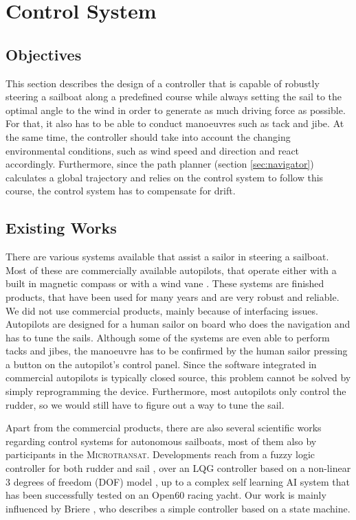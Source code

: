 \section{Control System}\label{sec:sailor}
\subsection{Objectives}
This section describes the design of a controller that is capable of robustly
steering a sailboat along a predefined course while always setting the sail to
the optimal angle to the wind in order to generate as much driving force as
possible. For that, it also has to be able to conduct manoeuvres such as tack
and jibe. At the same time, the controller should take into account the
changing environmental conditions, such as wind speed and direction and react
accordingly. Furthermore, since the path planner (section \ref{sec:navigator})
calculates a global trajectory and relies on the control system to follow this
course, the control system has to compensate for drift.
%
\subsection{Existing Works}
There are various systems available that assist a sailor in steering a
sailboat. Most of these are commercially available autopilots, that operate
either with a built in magnetic compass or with a wind vane
\cite{hochseeportverband1958s}. These systems are finished products, that have
been used for many years and are very robust and reliable. We did not use
commercial products, mainly because of interfacing issues. Autopilots are
designed for a human sailor on board who does the navigation and has to tune
the sails. Although some of the systems are even able to perform tacks and
jibes, the manoeuvre has to be confirmed by the human sailor pressing a button
on the autopilot's control panel. Since the software integrated in commercial
autopilots is typically closed source, this problem cannot be solved by simply
reprogramming the device. Furthermore, most autopilots only control the rudder,
so we would still have to figure out a way to tune the sail.

Apart from the commercial products, there are also several scientific works
regarding control systems for autonomous sailboats, most of them also by
participants in the \textsc{Microtransat}. Developments reach from a fuzzy
logic controller for both rudder and sail \cite{stelzerFuzzy}, over an LQG
controller based on a non-linear 3 degrees of freedom (DOF) model
\cite{elkaim:ska}, up to a complex self learning AI system that has been
successfully tested on an Open60 racing yacht. Our work is mainly influenced by
Briere \cite{briere2008iar}, who describes a simple controller based on a state
machine.
%
